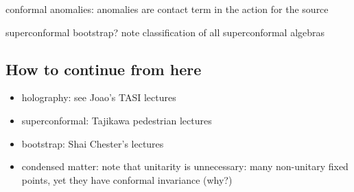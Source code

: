 \documentclass[a4paper,12pt]{article}
\numberwithin{equation}{section}
\begin{document}
conformal anomalies: anomalies are contact term in the action for the source


superconformal bootstrap? note classification of all superconformal algebras


\subsection{How to continue from here}


\begin{itemize}

\item
holography: see Joao's TASI lectures

\item
superconformal: Tajikawa pedestrian lectures

\item
bootstrap: Shai Chester's lectures

\item
condensed matter:
note that unitarity is unnecessary: many non-unitary fixed points, yet they have conformal invariance (why?)

\end{itemize}



%
%
\end{document}
